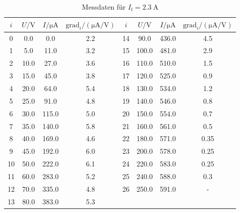 \begin{table}[h]
    \centering
    \begin{tabular}{S[table-format=:.0] S S S S[table-format=:.0] S S S}
        \toprule
        {$i$} &
        {$U / \unit{\volt}$} &
        {$I/ \unit{\micro\ampere}$} &
        {$\text{grad}_i/ (\unit{\micro\ampere\per\volt})$}&
        {$i$} &
        {$U / \unit{\volt}$} &
        {$I/ \unit{\micro\ampere}$} &
        {$\text{grad}_i/ (\unit{\micro\ampere\per\volt})$} \\
           & 0.0       & 0.0      & 2.2  &       14  & 90.0      & 436.0    & 4.5 \\
        1   & 5.0       & 11.0     & 3.2  &       15  & 100.0     & 481.0    & 2.9 \\
        2   & 10.0      & 27.0     & 3.6  &       16  & 110.0     & 510.0    & 1.5 \\
        3   & 15.0      & 45.0     & 3.8  &       17  & 120.0     & 525.0    & 0.9 \\
        4   & 20.0      & 64.0     & 5.4  &       18  & 130.0     & 534.0    & 1.2 \\
        5   & 25.0      & 91.0     & 4.8  &       19  & 140.0     & 546.0    & 0.8 \\
        6   & 30.0      & 115.0    & 5.0  &       20  & 150.0     & 554.0    & 0.7 \\
        7   & 35.0      & 140.0    & 5.8  &       21  & 160.0     & 561.0    & 0.5 \\
        8   & 40.0      & 169.0    & 4.6  &       22  & 180.0     & 571.0    & 0.35 \\
        9   & 45.0      & 192.0    & 6.0  &       23  & 200.0     & 578.0    & 0.25 \\
        10  & 50.0      & 222.0    & 6.1  &       24  & 220.0     & 583.0    & 0.25 \\
        11  & 60.0      & 283.0    & 5.2  &       25  & 240.0     & 588.0    & 0.3 \\
        12  & 70.0      & 335.0    & 4.8  &       26  & 250.0     & 591.0    & {-} \\
        13  & 80.0      & 383.0    & 5.3  & & & &  \\

        \bottomrule
    \end{tabular}
    \caption{Messdaten für $I_\text{f}= \qty{2.3}{\ampere}$}
    \label{tab:c02}
\end{table}